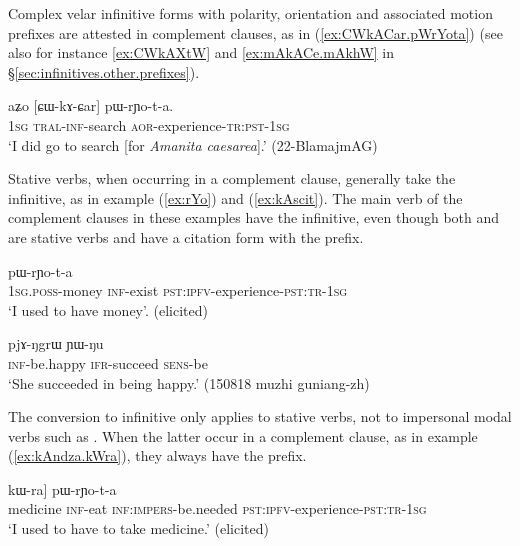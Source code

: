  Complex velar infinitive forms with polarity, orientation and associated motion prefixes are attested in complement clauses, as in (\ref{ex:CWkACar.pWrYota}) (see also for instance \ref{ex:CWkAXtW} and \ref{ex:mAkACe.mAkhW} in §\ref{sec:infinitives.other.prefixes}).
 
\begin{exe}
\ex \label{ex:CWkACar.pWrYota}
 \gll aʑo [ɕɯ-kɤ-ɕar] pɯ-rɲo-t-a. \\
 \textsc{1sg} \textsc{tral}-\textsc{inf}-search \textsc{aor}-experience-\textsc{tr}:\textsc{pst}-\textsc{1sg} \\
 \glt `I did go to search [for \textit{Amanita caesarea}].'  (22-BlamajmAG) 
\end{exe}

Stative verbs, when occurring in a complement clause, generally take the  infinitive, as in example  (\ref{ex:rYo}) and (\ref{ex:kAscit}). The main verb of the complement clauses in these examples have the  infinitive, even though both  and  are stative verbs and have a citation form with the  prefix.

\begin{exe}
\ex \label{ex:rYo}
\gll   [a-rŋɯl kɤ-tu] pɯ-rɲo-t-a \\
\textsc{1sg}.\textsc{poss}-money \textsc{inf}-exist \textsc{pst}:\textsc{ipfv}-experience-\textsc{pst}:\textsc{tr}-\textsc{1sg} \\
\glt `I used to have money'. (elicited)
\end{exe}

\begin{exe}
\ex \label{ex:kAscit}
 \gll  [kɤ-scit] pjɤ-ŋgrɯ ɲɯ-ŋu  \\
 \textsc{inf}-be.happy \textsc{ifr}-succeed \textsc{sens}-be \\
 \glt `She succeeded in being happy.' (150818 muzhi guniang-zh) 
 \end{exe} 
 
The conversion to  infinitive only applies to stative verbs, not to impersonal modal verbs such as . When the latter occur in a complement clause, as in example (\ref{ex:kAndza.kWra}), they always have the  prefix.

\begin{exe}
\ex \label{ex:kAndza.kWra}
\gll  [[smɤn kɤ-ndza] kɯ-ra] pɯ-rɲo-t-a  \\ 
medicine \textsc{inf}-eat \textsc{inf}:\textsc{impers}-be.needed  \textsc{pst}:\textsc{ipfv}-experience-\textsc{pst}:\textsc{tr}-\textsc{1sg} \\
\glt `I used to have to take medicine.' (elicited)
\end{exe} 
 
